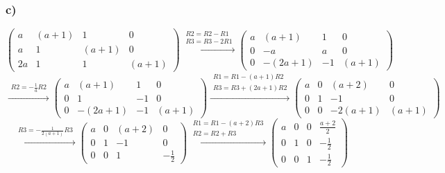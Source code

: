 \documentclass[11pt]{article}
\begin{document}
\subsubsection*{c)}
\[
 \left(
\begin{array}{ccc|c}
a & (a+1) & 1 & 0 \\
a & 1 & (a+1) & 0 \\
2a & 1 & 1 & (a+1)
\end{array}
\right)
\overset{\begin{matrix}
  R2 = R2-R1 \\
  R3 = R3-2R1
 \end{matrix}}{\rightarrow}
 \left(
\begin{array}{ccc|c}
a & (a+1) & 1 & 0 \\
0 & -a & a & 0 \\
0 & -(2a+1) & -1 & (a+1)
\end{array}
\right)
\]
\[
\overset{\begin{matrix}
  R2 = -\frac{1}{a}R2
 \end{matrix}}{\rightarrow}
 \left(
\begin{array}{ccc|c}
a & (a+1) & 1 & 0 \\
0 & 1 & -1 & 0 \\
0 & -(2a+1) & -1 & (a+1)
\end{array}
\right)
\overset{\begin{matrix}
	R1=R1-(a+1)R2\\
	R3=R3+(2a+1)R2
 \end{matrix}}{\rightarrow}
 \left(
\begin{array}{ccc|c}
a & 0 & (a+2) & 0 \\
0 & 1 & -1 & 0 \\
0 & 0 & -2(a+1) & (a+1)
\end{array}
\right)
\]
\[
\overset{\begin{matrix}
	R3=-\frac{1}{2(a+1)}R3
 \end{matrix}}{\rightarrow}
 \left(
\begin{array}{ccc|c}
a & 0 & (a+2) & 0 \\
0 & 1 & -1 & 0 \\
0 & 0 & 1 & -\frac{1}{2}
\end{array}
\right)
\overset{\begin{matrix}
	R1=R1-(a+2)R3\\
	R2=R2+R3
 \end{matrix}}{\rightarrow}
 \left(
\begin{array}{ccc|c}
a & 0 & 0 & \frac{a+2}{2} \\
0 & 1 & 0 & -\frac{1}{2} \\
0 & 0 & 1 & -\frac{1}{2}
\end{array}
\right)
\]
\end{document}
